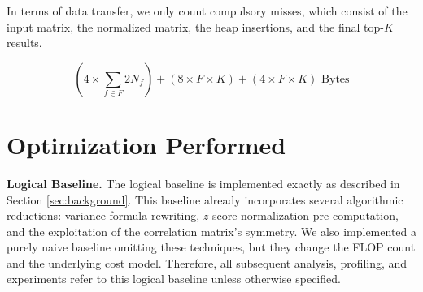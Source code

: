 \documentclass[letterpaper]{article}
\newcommand{\mypar}[1]{{\bf #1.}}
\begin{document}
In terms of data transfer, we only count compulsory misses, which consist of the input matrix, the normalized matrix, the heap insertions, and the final top-$K$ results. 

$$ (4 \times \sum_{f \in F} 2N_f) + (8 \times F \times K) + (4 \times F \times K) \text{ Bytes} $$

\section{Optimization Performed}\label{sec:yourmethod}






\mypar{Logical Baseline}
The logical baseline is implemented exactly as described in Section \ref{sec:background}.
This baseline already incorporates several algorithmic reductions: variance formula rewriting, $z$-score normalization pre-computation, and the exploitation of the correlation matrix's symmetry.
We also implemented a purely naive baseline omitting these techniques, but they change the FLOP count and the underlying cost model.
Therefore, all subsequent analysis, profiling, and experiments refer to this logical baseline unless otherwise specified.
\end{document}
